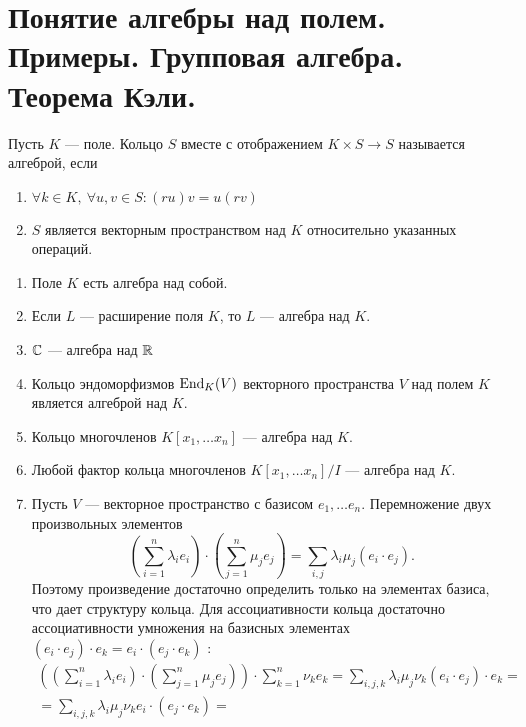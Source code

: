 \section{Понятие алгебры над полем. Примеры. Групповая алгебра. Теорема Кэли.}
\begin{defn}
    Пусть $ K $ --- поле. Кольцо  $ S$ вместе с отображением  $ K \times S \to  S$ называется алгеброй, если 
    \begin{enumerate}[noitemsep]
	\item $ \forall k \in K, ~ \forall u, v \in S\colon (ru)v = u(rv)$
	\item $ S$ является векторным пространством над $ K$ относительно указанных операций. 
    \end{enumerate} 
\end{defn}
\begin{ex}
    \begin{enumerate}[noitemsep]
        \item Поле $ K$ есть алгебра над собой.
	\item Если  $ L $ --- расширение поля  $ K$, то  $ L$ --- алгебра над   $ K$.
	\item  $ \mathbb{C}$ --- алгебра над  $ \mathbb{R}$
	\item  Кольцо эндоморфизмов  $ \operatorname{End}_K(V)$ векторного пространства  $ V$ над полем  $ K$ является алгеброй над  $ K$.
	\item Кольцо многочленов  $ K[x_1, \ldots x_n]$ --- алгебра над $ K$.
	\item Любой фактор кольца многочленов  $ K[x_1, \ldots x_n]/I$ --- алгебра над $ K$.
	\item Пусть $ V$ ---  векторное пространство с базисом $ e_1, \ldots e_n$. Перемножение двух произвольных элементов
	    \[
		\left( \sum_{i=1}^{n} \lambda _i e_i \right) \cdot \left( \sum_{j=1}^{n} \mu_j e_j \right)  = \sum_{i, j}^{} \lambda _i\mu_j (e_i \cdot e_j) 
	    .\] 
	    Поэтому произведение достаточно определить только на элементах базиса, что дает структуру кольца. Для ассоциативности кольца достаточно ассоциативности умножения на базисных элементах $ (e_i \cdot e_j) \cdot e_k = e_i \cdot (e_{j} \cdot e_k)$ :
	    \[
	    \begin{aligned}
		\left(
		\left( \sum_{i=1}^{n} \lambda _i e_i \right) \cdot \left( \sum_{j=1}^{n} \mu_j e_j \right) \right)
		\cdot 
		\sum_{k=1}^{n} \nu _ke_k = 
		\sum_{i, j, k}^{} \lambda _i \mu_j \nu_k (e_i \cdot e_j) \cdot e_k = \\ =
		\sum_{i, j, k}^{} \lambda _i \mu_j \nu_k e_i \cdot( e_j \cdot e_k) = 

\end{aligned}\]
\end{enumerate}
\end{ex}
